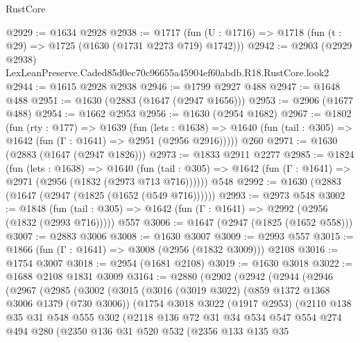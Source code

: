 \begin{lexlean}{RustCore}
\begin{coremodule}
@2929 := @1634 @2928
@2938 := @1717 (fun (U : @1716) => @1718 (fun (t : @29) => @1725 (@1630 (@1731 @2273 @719) @1742)))
@2942 := @2903 (@2929 @2938) LexLeanPreserve.Caded85d0ec70c96655a45904ef60abdb.R18.RustCore.look2
@2944 := @1615 @2928 @2938
@2946 := @1799 @2927 @488
@2947 := @1648 @488
@2951 := @1630 (@2883 (@1647 (@2947 @1656)))
@2953 := @2906 (@1677 @488)
@2954 := @1662 @2953
@2956 := @1630 (@2954 @1682)
@2967 := @1802
    (fun (rty : @177) =>
    @1639
      (fun (lets : @1638) =>
      @1640 (fun (tail : @305) => @1642 (fun (Γ : @1641) => @2951 (@2956 @2916)))))
    @260
@2971 := @1630 (@2883 (@1647 (@2947 @1826)))
@2973 := @1833 @2911 @2277
@2985 := @1824
    (fun (lets : @1638) =>
    @1640 (fun (tail : @305) => @1642 (fun (Γ : @1641) => @2971 (@2956 (@1832 (@2973 @713 @716))))))
    @548
@2992 := @1630 (@2883 (@1647 (@2947 (@1825 (@1652 (@549 @716))))))
@2993 := @2973 @548
@3002 := @1848
    (fun (tail : @305) => @1642 (fun (Γ : @1641) => @2992 (@2956 (@1832 (@2993 @716)))))
    @557
@3006 := @1647 (@2947 (@1825 (@1652 @558)))
@3007 := @2883 @3006
@3008 := @1630 @3007
@3009 := @2993 @557
@3015 := @1866 (fun (Γ : @1641) => @3008 (@2956 (@1832 @3009))) @2108
@3016 := @1754 @3007
@3018 := @2954 (@1681 @2108)
@3019 := @1630 @3018
@3022 := @1688 @2108 @1831 @3009
@3164 := @2880
    (@2902
      (@2942
        (@2944
          (@2946
            (@2967
              (@2985
                (@3002
                  (@3015
                    (@3016
                      (@3019 @3022)
                      (@859 @1372 @1368 @3006 @1379 (@730 @3006))
                      (@1754
                        @3018
                        @3022
                        (@1917 @2953)
                        (@2110
                          @138
                          @35
                          @31
                          @548
                          @555
                          @302
                          (@2118
                            @136
                            @72
                            @31
                            @34
                            @534
                            @547
                            @554
                            @274
                            @494
                            @280
                            (@2350
                              @136
                              @31
                              @520
                              @532
                              (@2356
                                @133
                                @135
                                @35

\end{coremodule}
\end{lexlean}
